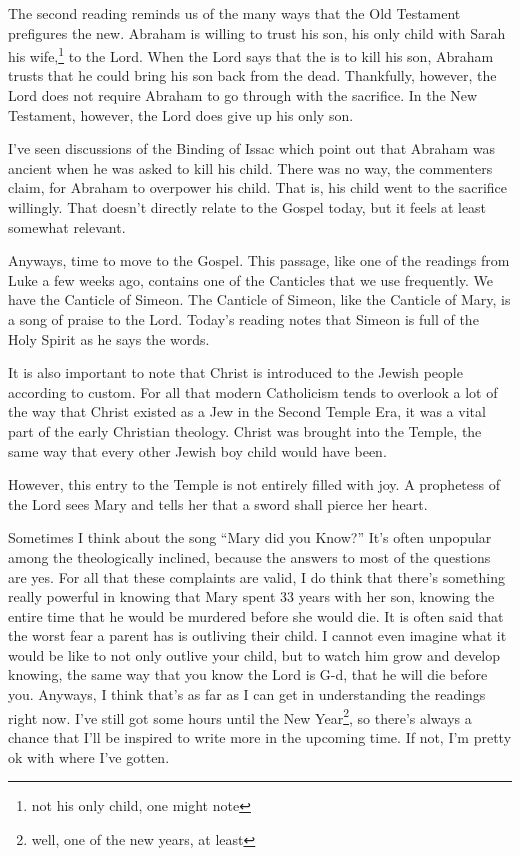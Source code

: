\documentclass[12pt]{article}[titlepage]
\newcommand{\say}[1]{``#1''}
\newcommand{\1}{\={a}}
\newcommand{\2}{\={e}}
\newcommand{\3}{\={\i}}
\newcommand{\4}{\=o}
\newcommand{\5}{\=u}
\newcommand{\6}{\={A}}
\renewcommand{\,}{\textsuperscript{,}}
\begin{document}
The second reading reminds us of the many ways that the Old Testament prefigures the new.
Abraham is willing to trust his son, his only child with Sarah his wife,\footnote{not his only child, one might note} to the Lord.
When the Lord says that the is to kill his son, Abraham trusts that he could bring his son back from the dead.
Thankfully, however, the Lord does not require Abraham to go through with the sacrifice.
In the New Testament, however, the Lord does give up his only son.

I've seen discussions of the Binding of Issac which point out that Abraham was ancient when he was asked to kill his child.
There was no way, the commenters claim, for Abraham to overpower his child.
That is, his child went to the sacrifice willingly.
That doesn't directly relate to the Gospel today, but it feels at least somewhat relevant.

Anyways, time to move to the Gospel.
This passage, like one of the readings from Luke a few weeks ago, contains one of the Canticles that we use frequently.
We have the Canticle of Simeon.
The Canticle of Simeon, like the Canticle of Mary, is a song of praise to the Lord.
Today's reading notes that Simeon is full of the Holy Spirit as he says the words.

It is also important to note that Christ is introduced to the Jewish people according to custom.
For all that modern Catholicism tends to overlook a lot of the way that Christ existed as a Jew in the Second Temple Era, it was a vital part of the early Christian theology.
Christ was brought into the Temple, the same way that every other Jewish boy child would have been.

However, this entry to the Temple is not entirely filled with joy.
A prophetess of the Lord sees Mary and tells her that a sword shall pierce her heart.

Sometimes I think about the song \say{Mary did you Know?}
It's often unpopular among the theologically inclined, because the answers to most of the questions are yes.
For all that these complaints are valid, I do think that there's something really powerful in knowing that Mary spent 33 years with her son, knowing the entire time that he would be murdered before she would die.
It is often said that the worst fear a parent has is outliving their child.
I cannot even imagine what it would be like to not only outlive your child, but to watch him grow and develop knowing, the same way that you know the Lord is G-d, that he will die before you.
Anyways, I think that's as far as I can get in understanding the readings right now.
I've still got some hours until the New Year\footnote{well, one of the new years, at least}, so there's always a chance that I'll be inspired to write more in the upcoming time.
If not, I'm pretty ok with where I've gotten.
\end{document}
